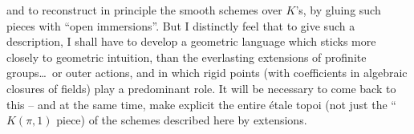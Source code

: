 and to reconstruct in principle the smooth schemes over $K$'s, by gluing such pieces with ``open immersions''. But I distinctly feel that to give such a description, I shall have to develop a geometric language which sticks more closely to geometric intuition, than the everlasting extensions of profinite groups\ldots\ or outer actions, and in which rigid points (with coefficients in algebraic closures of fields) play a predominant role. It will be necessary  to come back to this -- and at the same time, make explicit the entire étale topoi (not just the ``$K(\pi,1)$ piece) of the schemes described here by extensions.
